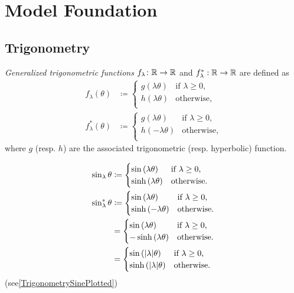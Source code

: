 \documentclass[../main.tex]{subfiles}
\begin{document}
\section{Model Foundation}
\subsection{Trigonometry}
\begin{definition}\label{M:Trigonometry}
\textit{Generalized trigonometric functions} $f_\lambda\colon \mathbb{R}\to\mathbb{R}$ and $f_\lambda^\ast:\mathbb{R}\to\mathbb{R}$ are defined as
\begin{align*}
f_\lambda\left(\theta\right)&\coloneqq
\begin{cases}
g\left(\lambda\theta\right)&\text{if $\lambda\geq0$,}\\
h\left(\lambda\theta\right)&\text{otherwise,}\\
\end{cases}\\
f_\lambda^\ast\left(\theta\right)&\coloneqq
\begin{cases}
g\left(\lambda\theta\right)&\text{if $\lambda\geq0$,}\\
h\left(-\lambda\theta\right)&\text{otherwise,}\\
\end{cases}
\end{align*}
where $g$ (resp. $h$) are the associated trigonometric (resp. hyperbolic) function.
\end{definition}
\begin{example}\label{M:Trigonometry:Sine}
\begin{align*}
\sin_\lambda{\theta}
&\coloneqq
\begin{cases}
\sin\left(\lambda\theta\right)&\text{if $\lambda\geq0$,}\\
\sinh\left(\lambda\theta\right)&\text{otherwise.}\\
\end{cases}\\
\sin_\lambda^\ast{\theta}
&\coloneqq
\begin{cases}
\sin\left(\lambda\theta\right)&\text{if $\lambda\geq0$,}\\
\sinh\left(-\lambda\theta\right)&\text{otherwise.}\\
\end{cases}\\
&=
\begin{cases}
\sin\left(\lambda\theta\right)&\text{if $\lambda\geq0$,}\\
-\sinh\left(\lambda\theta\right)&\text{otherwise.}\\
\end{cases}\\
&=\begin{cases}
\sin\left(\lvert\lambda\rvert\theta\right)&\text{if $\lambda\geq0$,}\\
\sinh\left(\lvert\lambda\rvert\theta\right)&\text{otherwise.}\\
\end{cases}
\end{align*}
(see\cref{TrigonometrySinePlotted})
\end{example}
\end{document}
